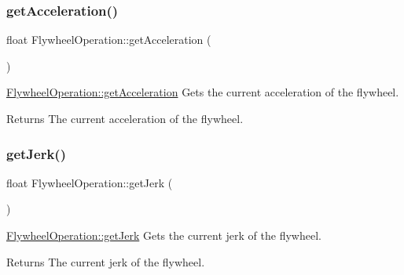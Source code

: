 \hypertarget{class_flywheel_operation_a23310ab41f29ee3d510c2d412fde801b}{}\label{class_flywheel_operation_a23310ab41f29ee3d510c2d412fde801b} 
\subsubsection{\texorpdfstring{get\+Acceleration()}{getAcceleration()}}
{\footnotesize\ttfamily float Flywheel\+Operation\+::get\+Acceleration (\begin{DoxyParamCaption}{ }\end{DoxyParamCaption})}



\hyperlink{class_flywheel_operation_a23310ab41f29ee3d510c2d412fde801b}{Flywheel\+Operation\+::get\+Acceleration} Gets the current acceleration of the flywheel. 

\begin{DoxyReturn}{Returns}
The current acceleration of the flywheel. 
\end{DoxyReturn}
\hypertarget{class_flywheel_operation_ad443ef22229c1584da213f50234720bf}{}\label{class_flywheel_operation_ad443ef22229c1584da213f50234720bf} 
\subsubsection{\texorpdfstring{get\+Jerk()}{getJerk()}}
{\footnotesize\ttfamily float Flywheel\+Operation\+::get\+Jerk (\begin{DoxyParamCaption}{ }\end{DoxyParamCaption})}



\hyperlink{class_flywheel_operation_ad443ef22229c1584da213f50234720bf}{Flywheel\+Operation\+::get\+Jerk} Gets the current jerk of the flywheel. 

\begin{DoxyReturn}{Returns}
The current jerk of the flywheel. 
\end{DoxyReturn}
\hypertarget{class_flywheel_operation_a2b9d24d0fbbf1d9cb79bb0aa54f6f6ae}{}\label{class_flywheel_operation_a2b9d24d0fbbf1d9cb79bb0aa54f6f6ae} 
